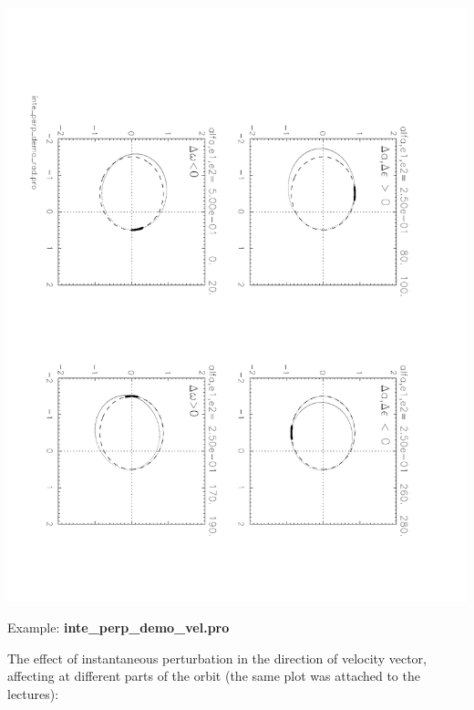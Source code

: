 \documentclass[a4paper,12pt]{article}
\def\red{\color{red}}
\def\black{\color{RGBblack}}
\begin{document}
{{\includegraphics[angle=90,width=0.75\paperwidth]{inte_perp_demo_rad.pdf}

\newpage
\black

Example: {\bf inte\_perp\_demo\_vel.pro}

\bul The effect of instantaneous perturbation in the direction of
velocity vector, affecting at different parts of the orbit (the same
plot was attached to the lectures):

{\scriptsize \red

}\black

}}
\end{document}
